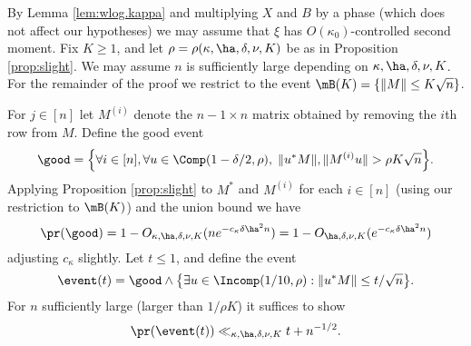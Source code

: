 \documentclass[aop,preprint]{imsart}
\theoremstyle{plain}
\theoremstyle{definition}
\theoremstyle{remark}
\numberwithin{equation}{section}
\numberwithin{theorem}{section}
\begin{document}
By Lemma \ref{lem:wlog.kappa} and multiplying $X$ and $B$ by a phase (which does not affect our hypotheses) we may assume that $\xi$ has $O(\kappa_0)$-controlled second moment.
Fix $K\ge 1$, and let $\rho=\rho(\kappa,\ha,\delta,\nu,K)$ be as in Proposition \ref{prop:slight}. 
We may assume $n$ is sufficiently large depending on $\kappa,\ha,\delta,\nu,K$.
For the remainder of the proof we restrict to the event $\mB(K) = \{\|M\|\le K\sqrt{n}\}$.

For $j\in [n]$ let $M^{(i)}$ denote the $n-1\times n$ matrix obtained by removing the $i$th row from $M$.
Define the good event
\begin{equation}
\good = \Big\{ \forall i\in [n], \forall u\in \Comp(1-\delta/2,\rho), \; \|u^*M\|,\|M^{(i)}u\| >\rho K\sqrt{n}\Big\}.
\end{equation}
Applying Proposition \ref{prop:slight} to $M^*$ and $M^{(i)}$ for each $i\in[n]$ (using our restriction to $\mB(K)$) and the union bound we have
\begin{equation}
\pr(\good) = 1- O_{\kappa,\ha,\delta,\nu,K}(ne^{-c_\kappa\delta \ha^2 n}) = 1- O_{\ha,\delta,\nu,K}(e^{-c_\kappa\delta \ha^2 n})
\end{equation}
adjusting $c_\kappa$ slightly. 
Let $t\le 1$, and define the event
\begin{equation}
\event(t) = \good\wedge \big\{ \exists u\in \Incomp(1/10,\rho): \|u^*M\|\le t/\sqrt{n}\big\}.
\end{equation}
For $n$ sufficiently large (larger than $1/\rho K$) it suffices to show 
\begin{equation}	\label{goal:broad1}
\pr(\event(t)) \ll_{\kappa,\ha,\delta,\nu,K} t + n^{-1/2}.
\end{equation}
\end{document}

